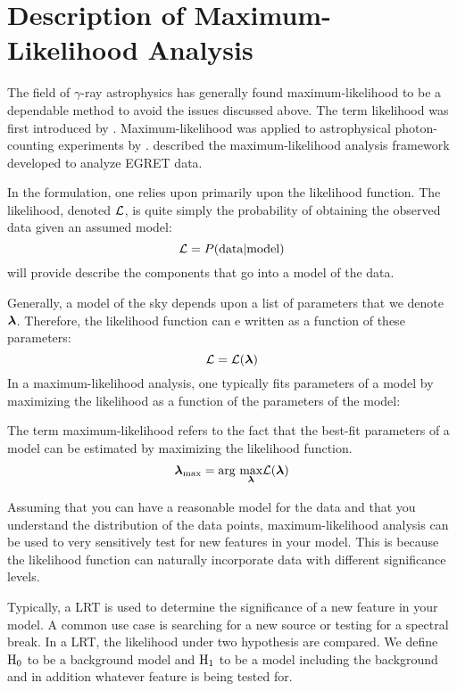 \section{Description of Maximum-Likelihood Analysis}

The field of $\gamma$-ray astrophysics has generally
found maximum-likelihood to be a dependable method to
avoid the issues discussed above.  The term likelihood was
first introduced by \cite{fisher_1925_statistical-methods}.
Maximum-likelihood was applied to astrophysical photon-counting
experiments by \cite{cash_1979_parameter-estimation}.
\cite{mattox_1996a_likelihood-analysis} described the maximum-likelihood
analysis framework developed to analyze \ac{EGRET} data.

In the formulation, one relies upon primarily upon the likelihood
function.  The likelihood, denoted $\mathcal{L}$, is quite simply the
probability of obtaining the observed data given an assumed model:
\begin{equation}
  \mathcal{L} = P(\text{data}|\text{model})
\end{equation}
 will provide describe the components that go
into a model of the data.

Generally, a model of the sky depends upon a list of parameters that we
denote $\boldsymbol{\lambda}$.  Therefore, the likelihood function can e written
as a function of these parameters:
\begin{equation}
  \mathcal{L} = \mathcal{L}(\boldsymbol{\lambda})
\end{equation}
In a maximum-likelihood analysis, one typically fits parameters of a model
by maximizing the likelihood as a function of the parameters of the model:

The term maximum-likelihood refers to the fact that the best-fit
parameters of a model can be estimated by maximizing the likelihood
function.
\begin{equation}
\boldsymbol{\lambda}_\text{max} = \underset{}{\text{arg }}\underset{\boldsymbol{\lambda}}{\text{max}} \mathcal{L}(\boldsymbol{\lambda})
\end{equation}

Assuming that you can have a reasonable model for the data and that
you understand the distribution of the data points, maximum-likelihood
analysis can be used to very sensitively test for new features in
your model.  This is because the likelihood function can naturally
incorporate data with different significance levels.

Typically, a \ac{LRT} is used to determine the significance of a new
feature in your model. A common use case is searching for a new source
or testing for a spectral break. In a \ac{LRT}, the likelihood under two
hypothesis are compared. We define $\text{H}_0$ to be a background
model and $\text{H}_1$ to be a model including the background and in
addition whatever feature is being tested for.


